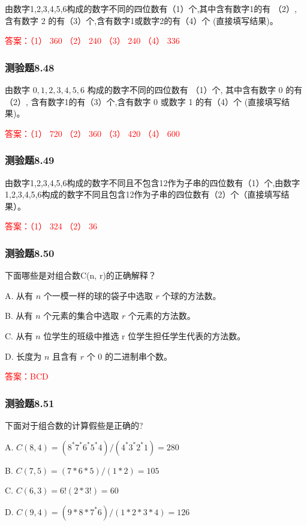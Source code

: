 \documentclass[UTF8, heading=true]{ctexart}
\begin{document}
由数字1,2,3,4,5,6构成的数字不同的四位数有（1）个,其中含有数字1的有
（2）, 含有数字 2 的有（3）个,含有数字1或数字2的有（4）个 (直接填写结果)。

\textcolor{red}{答案：（1） 360 （2） 240 （3） 240 （4） 336}

\subsubsection{测验题8.48}

由数字 $0,1,2,3,4,5,6$ 构成的数字不同的四位数有 （1）个, 其中含有数字 0 的有
（2）, 含有数字1的有（3）个,含有数字 0 或数字 1 的有（4）个 (直接填写结果)。

\textcolor{red}{答案：（1） 720 （2） 360 （3） 420 （4） 600}

\subsubsection{测验题8.49}
由数字1,2,3,4,5,6构成的数字不同且不包含12作为子串的四位数有（1）个,由数字1,2,3,4,5,6构成的数字不同且包含12作为子串的四位数有（2）个（直接填写结果）。

\textcolor{red}{答案：（1） 324 （2） 36}

\subsubsection{测验题8.50}

下面哪些是对组合数C(n, r)的正确解释？

A. 从有 $n$ 个一模一样的球的袋子中选取 $r$ 个球的方法数。

B. 从有 $n$ 个元素的集合中选取 $r$ 个元素的方法数。

C. 从有 $n$ 位学生的班级中推选 r 位学生担任学生代表的方法数。

D. 长度为 $n$ 且含有 $r$ 个 0 的二进制串个数。

\textcolor{red}{答案：BCD}

\subsubsection{测验题8.51}

下面对于组合数的计算假些是正确的?

A. $C(8,4)=\left(8^* 7^* 6^* 5^* 4\right) /\left(4^* 3^* 2^* 1\right)=280$

B. $C(7,5)=(7 * 6 * 5) /(1 * 2)=105$

C. $C(6,3)=6!(2 * 3!)=60$

D. $C(9,4)=\left(9 * 8 * 7^* 6\right) /(1 * 2 * 3 * 4)=126$
\end{document}
